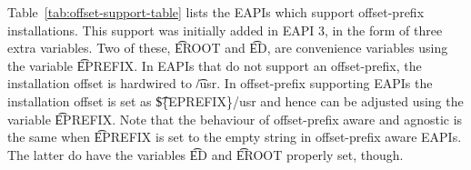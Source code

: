  Table~\ref{tab:offset-support-table} lists the EAPIs which support
offset-prefix installations. This support was initially added in EAPI 3, in the form of three extra
variables.  Two of these, \t{EROOT} and \t{ED}, are convenience variables using the variable
\t{EPREFIX}. In EAPIs that do not support an offset-prefix, the installation offset is hardwired to
\t{/usr}. In offset-prefix supporting EAPIs the installation offset is set as \t{\$\{EPREFIX\}/usr}
and hence can be adjusted using the variable \t{EPREFIX}. Note that the behaviour of offset-prefix
aware and agnostic is the same when \t{EPREFIX} is set to the empty string in offset-prefix aware
EAPIs.  The latter do have the variables \t{ED} and \t{EROOT} properly set, though.


